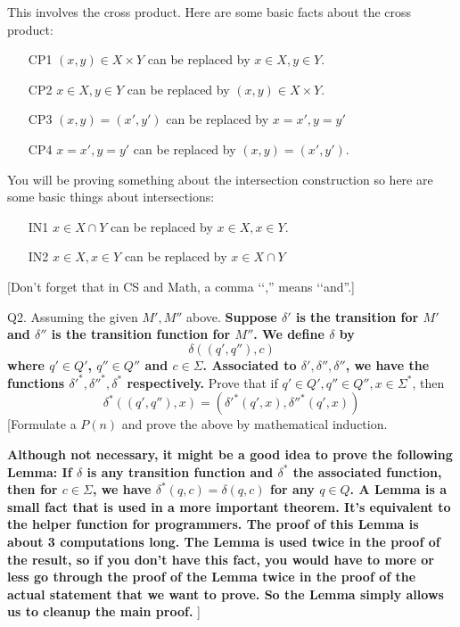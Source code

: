 This involves the cross product. Here are some basic facts about the
cross product:
\begin{enumerate}
\item[CP1] $(x,y) \in X \times Y$ can be replaced by
           $x \in X, y \in Y$.
\item[CP2] $x \in X, y \in Y$
           can be replaced by
           $(x,y) \in X \times Y$.
\item[CP3] $(x,y) = (x',y')$
           can be replaced by 
           $x=x', y=y'$
\item[CP4] $x=x', y=y'$
           can be replaced by 
           $(x,y) = (x',y')$.
\end{enumerate}
You will be proving something about the intersection construction
so here are some basic things about intersections:
\begin{enumerate}
\item[IN1] $x \in X \cap Y$ 
           can be replaced by
           $x \in X, x \in Y$.
\item[IN2] $x \in X, x \in Y$
           can be replaced by
           $x \in X \cap Y$
\end{enumerate}
[Don't forget that in CS and Math, a comma \lq\lq,'' means \lq\lq and''.]

\newpage
Q2. Assuming the given $M', M''$ above. 
{\bf 
Suppose $\delta'$ is the transition for $M'$
and $\delta''$ is the transition function for $M''$.
We define $\delta$ by 
\[
\delta((q', q''), c)
\]
where $q'\in Q'$, $q'' \in Q''$ and $c \in \Sigma$.
Associated to $\delta', \delta'', \delta''$, 
we have the functions $\delta'^*, \delta''^*, \delta^*$ respectively.
}
Prove that
if $q' \in Q', q'' \in Q'', x \in \Sigma^*$, then
\[
\delta^*((q', q''), x)
=
(
\delta'^*(q', x),
\delta''^*(q', x)
)
\]
[Formulate a $P(n)$ and prove the above by mathematical induction.

{\bf Although not necessary, it might be a good idea to prove the following
Lemma: If $\delta$ is any transition function and $\delta^*$
the associated function, then for $c \in \Sigma$, we have
$\delta^*(q, c) = \delta(q, c)$ for any $q \in Q$.
A Lemma is a small fact that is used in a more important theorem.
It's equivalent to the helper function for programmers.
The proof of this Lemma is about 3 computations long.
The Lemma is used twice in the proof of the result, so if you 
don't have this fact, you would have to more or less go through the 
proof of the Lemma twice in the proof of the actual statement that
we want to prove.
So the Lemma simply allows us to cleanup the main proof.
}]

